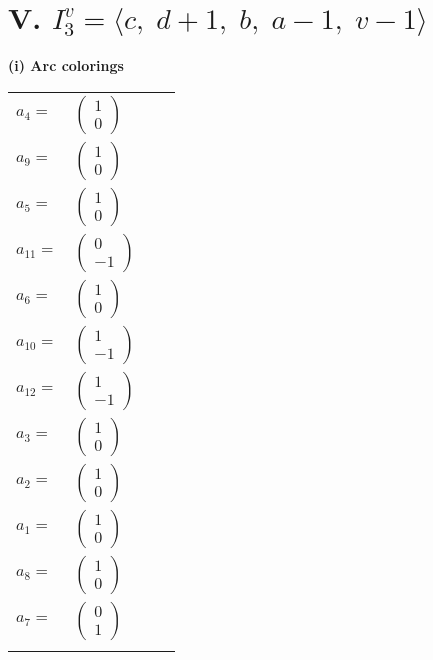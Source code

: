 \documentclass[1p]{elsarticle_modified}
\theoremstyle{definition}
\begin{document}
\centering \section*{V. $I^v_{3}= \langle c,\;d+1,\;b,\;a-1,\;v-1 \rangle$}
\flushleft \textbf{(i) Arc colorings}\\
\begin{tabular}{m{7pt} m{180pt} m{7pt} m{180pt} }
\flushright $a_{4}=$&$\begin{pmatrix}1\\0\end{pmatrix}$ \\
\flushright $a_{9}=$&$\begin{pmatrix}1\\0\end{pmatrix}$ \\
\flushright $a_{5}=$&$\begin{pmatrix}1\\0\end{pmatrix}$ \\
\flushright $a_{11}=$&$\begin{pmatrix}0\\-1\end{pmatrix}$ \\
\flushright $a_{6}=$&$\begin{pmatrix}1\\0\end{pmatrix}$ \\
\flushright $a_{10}=$&$\begin{pmatrix}1\\-1\end{pmatrix}$ \\
\flushright $a_{12}=$&$\begin{pmatrix}1\\-1\end{pmatrix}$ \\
\flushright $a_{3}=$&$\begin{pmatrix}1\\0\end{pmatrix}$ \\
\flushright $a_{2}=$&$\begin{pmatrix}1\\0\end{pmatrix}$ \\
\flushright $a_{1}=$&$\begin{pmatrix}1\\0\end{pmatrix}$ \\
\flushright $a_{8}=$&$\begin{pmatrix}1\\0\end{pmatrix}$ \\
\flushright $a_{7}=$&$\begin{pmatrix}0\\1\end{pmatrix}$\\&\end{tabular}
\end{document}
